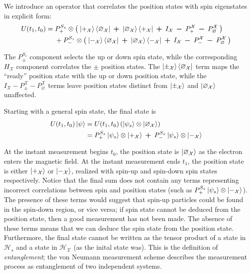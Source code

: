 We introduce an operator that correlates the position states with spin eigenstates in explicit form:
\begin{align} \label{eq: Experiment 1 unitary operator}
  U(t_1, t_0) &= P^{S_z}_+ \otimes \left(\: \ket{+_{\mathcal{X}}}\bra{\varnothing_\mathcal{X}} \: \bm{+} \: \ket{\varnothing_\mathcal{X}}\bra{+_\mathcal{X}} \: \bm{+} \: I_\mathcal{X} \: \bm{-} \: P^\mathcal{X}_+  \: \bm{-} \: P^\mathcal{X}_\varnothing \: \right) \\ \nonumber
  &\phantom{{}={}} + P^{S_z}_- \otimes \left( \: \ket{-_{\mathcal{X}}}\bra{\varnothing_\mathcal{X}} \: \bm{+} \: \ket{\varnothing_\mathcal{X}}\bra{-_\mathcal{X}} \: \bm{+} \: I_\mathcal{X} \: \bm{-} \: P^\mathcal{X}_-  \: \bm{-} \: P^\mathcal{X}_\varnothing \: \right)
\end{align}

The $P^{S_z}_\pm$ component selects the up or down spin state, while the corresponding $H_\mathcal{X}$ component correlates the $\pm$ position states. The $\ket{\pm_\mathcal{X}}\bra{\varnothing_\mathcal{X}}$ term maps the ``ready'' position state with the up or down position state, while the $I_\mathcal{X} - P^\mathcal{X}_\pm - P^\mathcal{X}_\varnothing$ terms leave position states distinct from $\ket{\pm_\mathcal{X}}$ and $\ket{\varnothing_\mathcal{X}}$ unaffected.

Starting with a general spin state, the final state is
\begin{align} \label{eq: Experiment 1 final state}
  U(t_1, t_0)\ket{\psi} & =  U(t_1, t_0) \left(\ket{\psi_s} \otimes \ket{\varnothing_\mathcal{X}} \right) \\
  &= \nonumber P^{S_z}_+ \ket{\psi_s} \otimes \ket{+_{\mathcal{X}}} \: \bm{+} \: P^{S_z}_- \ket{\psi_s} \otimes \ket{-_{\mathcal{X}}}
\end{align}

At the instant measurement begins $t_0$, the position state is $\ket{\varnothing_\mathcal{X}}$ as the electron enters the magnetic field. At the instant measurement ends $t_1$, the position state is either $\ket{+_{\mathcal{X}}}$ or $\ket{-_{\mathcal{X}}}$, realized with spin-up and spin-down spin states respectively. Notice that the final sum does not contain any terms representing incorrect correlations between spin and position states (such as $ P^{S_z}_+ \ket{\psi_s} \otimes \ket{-_{\mathcal{X}}}$). The presence of these terms would suggest that spin-up particles could be found in the spin-down region, or vice versa; if spin state cannot be deduced from the position state, then a good measurement has not been made. The absence of these terms means that we can deduce the spin state from the position state. Furthermore, the final state cannot be written as the tensor product of a state in $\mathcal{H}_s$ and a state in $\mathcal{H}_\mathcal{X}$ (as the inital state was). This is the definition of \textit{entanglement}; the von Neumann measurement scheme describes the measurement process as entanglement of two independent systems.

